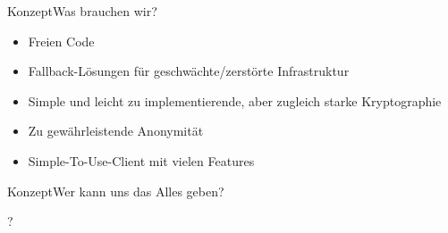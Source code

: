 

\begin{frame}{Konzept}{Was brauchen wir?}
	\begin{itemize}[<+->]
		\item Freien Code
		\item Fallback-Lösungen für geschwächte/zerstörte Infrastruktur
		\item Simple und leicht zu implementierende, aber zugleich starke Kryptographie
		\item Zu gewährleistende Anonymität
		\item Simple-To-Use-Client mit vielen Features
	\end{itemize}
\end{frame}


\begin{frame}{Konzept}{Wer kann uns das Alles geben?}
	\begin{center}
		\Huge ?
	\end{center}
\end{frame}

